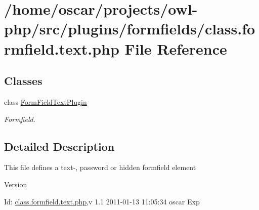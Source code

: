 \section{/home/oscar/projects/owl-\/php/src/plugins/formfields/class.formfield.text.php File Reference}
\label{class_8formfield_8text_8php}
\subsection*{Classes}
\begin{DoxyCompactItemize}
\item 
class \hyperlink{classFormFieldTextPlugin}{FormFieldTextPlugin}
\begin{DoxyCompactList}\small\item\em Formfield. \item\end{DoxyCompactList}\end{DoxyCompactItemize}


\subsection{Detailed Description}
This file defines a text-\/, password or hidden formfield element \begin{DoxyVersion}{Version}

\end{DoxyVersion}
\begin{DoxyParagraph}{Id:}
\hyperlink{class_8formfield_8text_8php}{class.formfield.text.php},v 1.1 2011-\/01-\/13 11:05:34 oscar Exp 
\end{DoxyParagraph}
